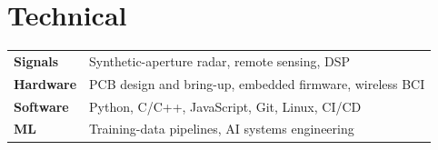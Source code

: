 \documentclass[10pt,letterpaper]{article}
\begin{document}
\section{Technical}
{\footnotesize
\begin{tabular}{@{}>{\bfseries}p{}p{}@{}}
Signals   & Synthetic-aperture radar, remote sensing, DSP \\
Hardware  & PCB design and bring-up, embedded firmware, wireless BCI \\
Software  & Python, C/C++, JavaScript, Git, Linux, CI/CD \\
ML        & Training-data pipelines, AI systems engineering \\
\end{tabular}}
\end{document}
